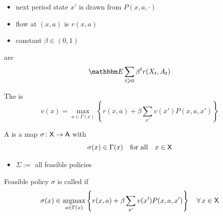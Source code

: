 \documentclass[dvipsnames]{beamer}
\begin{document}
\begin{frame}

    \begin{itemize}
        \item next period state $x'$ is drawn from $P(x,a, \cdot)$
    \vspace{0.5em}
        \item flow  at $(x, a)$ is $r(x, a)$ 
    \vspace{0.5em}
        \item constant  $\beta \in (0,1)$
    \end{itemize}


        \vspace{0.5em}
        \vspace{0.5em}

     are
    \begin{equation*}
        \EE \sum_{t \geq 0}
        \beta^t r(X_t, A_t)
    \end{equation*}

    \vspace{0.5em}
    \vspace{0.5em}
    The  is
    \begin{equation*}
            v(x)
            = \max_{a \in \Gamma(x)}
            \left\{
                r(x, a)
                + \beta
                \sum_{x'} v(x') P(x, a, x')
            \right\}
    \end{equation*}

\end{frame}



\begin{frame}
    

    A  is a map $\sigma \colon \mathsf X \to \mathsf A$ with
    \begin{equation*}
        \sigma(x) \in \Gamma(x)
        \quad \text{for all} \quad
        x \in \mathsf X
    \end{equation*}

    \begin{itemize}
        \item $\Sigma := $ all feasible policies
    \end{itemize}


    \vspace{0.5em}
    \vspace{0.5em}
    \vspace{0.5em}
    \vspace{0.5em}

    Feasible policy $\sigma$ is called  if
    \begin{equation*}
        \sigma(x) \in             
        \argmax_{a \in \Gamma(x)}
        \left\{
            r(x, a)
            + \beta
            \sum_{x'} v(x') P(x, a, x')
        \right\}
        \quad \forall \, x \in \Xsf
    \end{equation*}

\end{frame}
\end{document}
